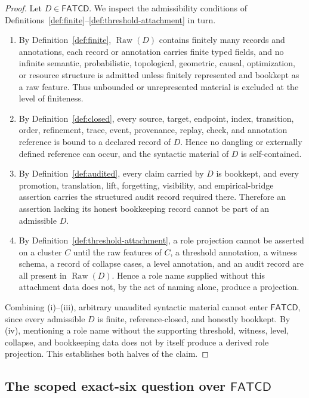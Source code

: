 \documentclass[11pt]{article}
\theoremstyle{definition}
\newcommand{\FATCD}{\ensuremath{\mathsf{FATCD}}}
\newcommand{\Raw}[1]{\ensuremath{\operatorname{Raw}\!\left(#1\right)}}
\begin{document}
\begin{proof}
Let \(D \in \FATCD{}\). We inspect the admissibility conditions of
Definitions~\ref{def:finite}--\ref{def:threshold-attachment} in turn.
\begin{enumerate}[label=(\roman*),topsep=2pt,itemsep=1pt]
  \item By Definition~\ref{def:finite}, \(\Raw{D}\) contains finitely many
    records and annotations, each record or annotation carries finite typed
    fields, and no infinite semantic, probabilistic, topological, geometric,
    causal, optimization, or resource structure is admitted unless finitely
    represented and bookkept as a raw feature. Thus unbounded or
    unrepresented material is excluded at the level of finiteness.
  \item By Definition~\ref{def:closed}, every source, target, endpoint,
    index, transition, order, refinement, trace, event, provenance, replay,
    check, and annotation reference is bound to a declared record of \(D\).
    Hence no dangling or externally defined reference can occur, and the
    syntactic material of \(D\) is self-contained.
  \item By Definition~\ref{def:audited}, every claim carried by \(D\) is
    bookkept, and every promotion, translation, lift, forgetting, visibility,
    and empirical-bridge assertion carries the structured audit record
    required there. Therefore an assertion lacking its honest bookkeeping
    record cannot be part of an admissible \(D\).
  \item By Definition~\ref{def:threshold-attachment}, a role projection
    cannot be asserted on a cluster \(C\) until the raw features of \(C\), a
    threshold annotation, a witness schema, a record of collapse cases, a
    level annotation, and an audit record are all present in \(\Raw{D}\).
    Hence a role name supplied without this attachment data does not, by the
    act of naming alone, produce a projection.
\end{enumerate}
Combining (i)--(iii), arbitrary unaudited syntactic material cannot enter
\FATCD{}, since every admissible \(D\) is finite, reference-closed, and
honestly bookkept. By (iv), mentioning a role name without the supporting
threshold, witness, level, collapse, and bookkeeping data does not by itself
produce a derived role projection. This establishes both halves of the
claim.
\end{proof}

\subsection{The scoped exact-six question over \FATCD{}}\label{subsec:scoped-exact-six-question}
\end{document}
